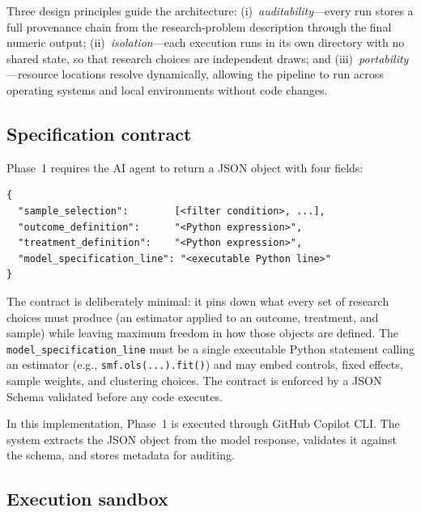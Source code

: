 \documentclass[12pt]{article}
\begin{document}
Three design principles guide the architecture: (i)~\emph{auditability}---every run stores a full provenance chain from the research-problem description through the final numeric output; (ii)~\emph{isolation}---each execution runs in its own directory with no shared state, so that research choices are independent draws; and (iii)~\emph{portability}---resource locations resolve dynamically, allowing the pipeline to run across operating systems and local environments without code changes.

\subsection*{Specification contract}

Phase~1 requires the AI agent to return a JSON object with four fields:
\begin{Verbatim}[fontsize=\small, frame=single]
{
  "sample_selection":        [<filter condition>, ...],
  "outcome_definition":      "<Python expression>",
  "treatment_definition":    "<Python expression>",
  "model_specification_line": "<executable Python line>"
}
\end{Verbatim}
The contract is deliberately minimal: it pins down what every set of research choices must produce (an estimator applied to an outcome, treatment, and sample) while leaving maximum freedom in how those objects are defined. The \texttt{model\_specification\_line} must be a single executable Python statement calling an estimator (e.g., \texttt{smf.ols(...).fit()}) and may embed controls, fixed effects, sample weights, and clustering choices. The contract is enforced by a JSON Schema validated before any code executes.

In this implementation, Phase~1 is executed through GitHub Copilot CLI. The system extracts the JSON object from the model response, validates it against the schema, and stores metadata for auditing.

\subsection*{Execution sandbox}
\end{document}
